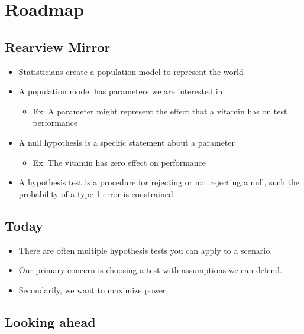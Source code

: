\documentclass[
]{book}
\providecommand{\tightlist}{%
  \setlength{\itemsep}{0pt}\setlength{\parskip}{0pt}}
\theoremstyle{definition}
\theoremstyle{definition}
\theoremstyle{definition}
\theoremstyle{definition}
\theoremstyle{remark}
\begin{document}
\section{Roadmap}\label{roadmap-3}

\subsection{Rearview Mirror}\label{rearview-mirror-1}

\begin{itemize}
\tightlist
\item
  Statisticians create a population model to represent the world
\item
  A population model has parameters we are interested in

  \begin{itemize}
  \tightlist
  \item
    Ex: A parameter might represent the effect that a vitamin has on test performance
  \end{itemize}
\item
  A null hypothesis is a specific statement about a parameter

  \begin{itemize}
  \tightlist
  \item
    Ex: The vitamin has zero effect on performance
  \end{itemize}
\item
  A hypothesis test is a procedure for rejecting or not rejecting a null, such the probability of a type 1 error is constrained.
\end{itemize}

\subsection{Today}\label{today}

\begin{itemize}
\tightlist
\item
  There are often multiple hypothesis tests you can apply to a scenario.
\item
  Our primary concern is choosing a test with assumptions we can defend.
\item
  Secondarily, we want to maximize power.
\end{itemize}

\subsection{Looking ahead}\label{looking-ahead}
\end{document}
